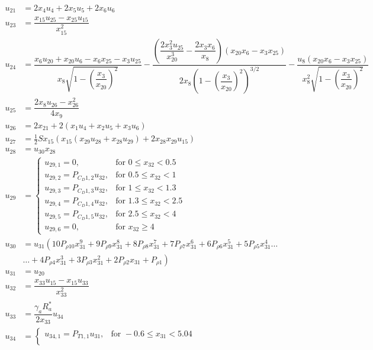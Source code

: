 \begin{equation} \label{eq:unAuxEq2}
\begin{split}
u_{21} &= 2x_{4}u_{4}+2x_{5}u_{5}+2x_{6}u_{6}\\
u_{23} &= \dfrac{x_{15}u_{25}-x_{25}u_{15}}{x_{15}^{2}}\\
u_{24} &=  \dfrac{x_{6}u_{20}+x_{20}u_{6}-x_{6}x_{25}-x_{3}u_{25}}{x_{8}\sqrt{1-\left(\dfrac{x_{3}}{x_{20}}\right)^{2}}}-\dfrac{\left(\dfrac{2x_{3}^{2}u_{25}}{x_{20}^{3}}-\dfrac{2x_{3}x_{6}}{x_{8}}\right)\left(x_{20}x_{6}-x_{3}x_{25}\right)}{2x_{8}\left(1-\left(\dfrac{x_{3}}{x_{20}}\right)^{2}\right)^{3/2}}-\dfrac{u_{8}\left(x_{20}x_{6}-x_{3}x_{25}\right)}{x_{8}^{2}\sqrt{1-\left(\dfrac{x_{3}}{x_{20}}\right)^{2}}}\\
u_{25} &=  \dfrac{2x_{8}u_{26}-x_{26}^{2}}{4x_{9}}\\
u_{26} &=  2x_{21}+2\left(x_{1}u_{4}+x_{2}u_{5}+x_{3}u_{6}\right)\\
u_{27} &=  \frac{1}{2}Sx_{15}\left(x_{15} \left(x_{29}u_{28}+x_{28}u_{29}\right)+2x_{28}x_{29}u_{15}\right) \\
u_{28} &= u_{30}x_{28} \\
u_{29} &=\begin{cases}
u_{29,1}=0, & \text{for } 0\leq x_{32} < 0.5\\
u_{29,2}=P_{C_{D} 1,2}u_{32}, &  \text{for } 0.5\leq x_{32} < 1 \\
u_{29,3}=P_{C_{D} 1,3}u_{32}, &  \text{for } 1\leq x_{32} < 1.3 \\
u_{29,4}=P_{C_{D} 1,4}u_{32}, &  \text{for } 1.3\leq x_{32} < 2.5 \\
u_{29,5}=P_{C_{D} 1,5}u_{32}, &  \text{for } 2.5\leq x_{32} < 4 \\
u_{29,6}=0, &  \text{for } x_{32} \geq 4 
\end{cases}\\
u_{30} &=u_{31} \left(10 P_{\rho 10}x_{31}^{9}+9 P_{\rho 9}x_{31}^{8}+8 P_{\rho 8}x_{31}^{7}+7 P_{\rho 7}x_{31}^{6}+6 P_{\rho 6}x_{31}^{5}+5 P_{\rho 5}x_{31}^{4}\dots \right. \\
& \left. \dotsc +4 P_{\rho 4}x_{31}^{3}+3 P_{\rho 3}x_{31}^{2}+2 P_{\rho 2}x_{31}+P_{\rho 1}\right) \\
u_{31} &= u_{20}\\
u_{32} &= \dfrac{x_{33}u_{15}-x_{15}u_{33}}{x_{33}^{2}}\\
u_{33} &= \dfrac{\gamma_{a}R_{a}^{*}}{2x_{33}}u_{34} \\
u_{34}&=\begin{cases}
u_{34,1}=P_{T 1,1}u_{31}, & \text{for } -0.6 \leq x_{31} < 5.04  \\

\end{cases}
\end{split}
\end{equation}
